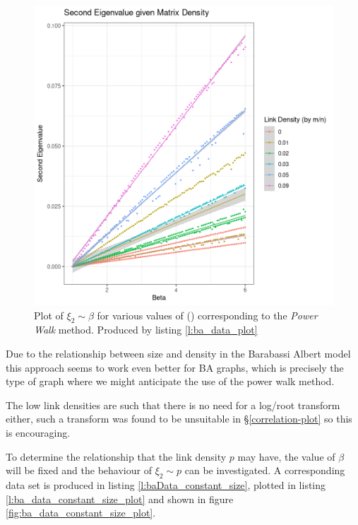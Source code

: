 \documentclass[11pt]{report}
\begin{document}
\begin{figure}[htbp]
\centering
\includegraphics[width=12cm]{media/constant_dens_ba_density_sqrt.png}
\caption{\label{fig:ba_data_plot} Plot of \(\xi_{2}\sim \beta\) for various values of \left(\right)\) corresponding to the \textit{Power Walk} method. Produced by listing \ref{l:ba_data_plot} }
\end{figure}

Due to the relationship between size and density in the Barabassi Albert model this approach seems to work even better for BA graphs, which is precisely the type of graph where we might anticipate the use of the power walk method.

The low link densities are such that there is no need for a log/root transform either, such a transform was found to be unsuitable in \S \ref{correlation-plot} so this is encouraging.

To determine the relationship that the link density \(p\) may have, the value of
\(\beta\) will be fixed and the behaviour of \(\xi_{2} \sim p\) can be
investigated. A corresponding data set is produced in listing
\ref{l:baData_constant_size}, plotted in listing \ref{l:ba_data_constant_size_plot} and
shown in figure \ref{fig:ba_data_constant_size_plot}.
\end{document}

